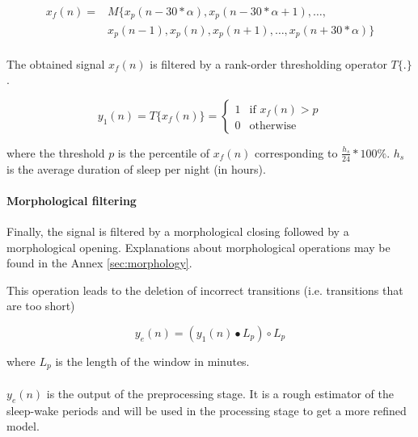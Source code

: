 \documentclass[a4paper,12pt]{article}
\begin{document}
\begin{equation}
\begin{split}
x_f(n) = & M\{x_p(n - 30 * \alpha), x_p(n - 30 * \alpha + 1), \ldots,\\
         & x_p(n - 1), x_p(n), x_p(n+1), \ldots, x_p(n + 30 * \alpha)\}
\end{split}
\end{equation}

\paragraph{}
\label{T-threshold}
The obtained signal $x_f(n)$ is filtered by a rank-order thresholding operator $T\{.\}$.

\begin{equation}
y_1(n) = T\{x_f(n)\} = \left\{
    \begin{array}{ll}
        1 & \mbox{if } x_f(n) > p \\
        0 & \mbox{otherwise}
    \end{array}
\right.
\end{equation}

where the threshold $p$ is the percentile of $x_f(n)$ corresponding to $\frac{h_s}{24}*100\%$. $h_s$ is the average duration of sleep per night (in hours).

\paragraph{Morphological filtering}
\label{closing-opening}
Finally, the signal is filtered by a morphological closing followed by a morphological opening. Explanations about morphological operations may be found in the Annex \ref{sec:morphology}.

This operation leads to the deletion of incorrect transitions (i.e. transitions that are too short)

\begin{equation}
y_e(n) = (y_1(n) \bullet L_p) \circ L_p
\end{equation}

where $L_p$ is the length of the window in minutes.

\paragraph{}
$y_e(n)$ is the output of the preprocessing stage. It is a rough estimator of the sleep-wake periods and will be used in the processing stage to get a more refined model.
\end{document}
